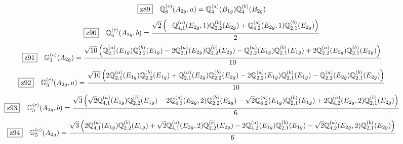 \documentclass[fleqn,10pt,landscape]{jsarticle}
\begin{document}
\begin{dmath*}
\hspace*{3mm}\fbox{z89}\quad \mathbb{Q}_{6}^{(c)}(A_{2g},a)=\mathbb{Q}_{4}^{(a)}(B_{1g}) \mathbb{Q}_{4}^{(b)}(B_{2g})
\end{dmath*}
\begin{dmath*}
\hspace*{3mm}\fbox{z90}\quad \mathbb{Q}_{6}^{(c)}(A_{2g},b)=\frac{\sqrt{2} \left(- \mathbb{Q}_{4,1}^{(a)}(E_{2g},1) \mathbb{Q}_{2,2}^{(b)}(E_{2g}) + \mathbb{Q}_{4,2}^{(a)}(E_{2g},1) \mathbb{Q}_{2,1}^{(b)}(E_{2g})\right)}{2}
\end{dmath*}
\begin{dmath*}
\hspace*{3mm}\fbox{z91}\quad \mathbb{G}_{1}^{(c)}(A_{2g})=\frac{\sqrt{10} \left(\mathbb{Q}_{2,1}^{(a)}(E_{1g}) \mathbb{Q}_{2,2}^{(b)}(E_{1g}) - 2 \mathbb{Q}_{2,1}^{(a)}(E_{2g}) \mathbb{Q}_{2,2}^{(b)}(E_{2g}) - \mathbb{Q}_{2,2}^{(a)}(E_{1g}) \mathbb{Q}_{2,1}^{(b)}(E_{1g}) + 2 \mathbb{Q}_{2,2}^{(a)}(E_{2g}) \mathbb{Q}_{2,1}^{(b)}(E_{2g})\right)}{10}
\end{dmath*}
\begin{dmath*}
\hspace*{3mm}\fbox{z92}\quad \mathbb{G}_{3}^{(c)}(A_{2g},a)=\frac{\sqrt{10} \left(2 \mathbb{Q}_{2,1}^{(a)}(E_{1g}) \mathbb{Q}_{2,2}^{(b)}(E_{1g}) + \mathbb{Q}_{2,1}^{(a)}(E_{2g}) \mathbb{Q}_{2,2}^{(b)}(E_{2g}) - 2 \mathbb{Q}_{2,2}^{(a)}(E_{1g}) \mathbb{Q}_{2,1}^{(b)}(E_{1g}) - \mathbb{Q}_{2,2}^{(a)}(E_{2g}) \mathbb{Q}_{2,1}^{(b)}(E_{2g})\right)}{10}
\end{dmath*}
\begin{dmath*}
\hspace*{3mm}\fbox{z93}\quad \mathbb{G}_{3}^{(c)}(A_{2g},b)=\frac{\sqrt{3} \left(\sqrt{2} \mathbb{Q}_{4,1}^{(a)}(E_{1g}) \mathbb{Q}_{2,2}^{(b)}(E_{1g}) - 2 \mathbb{Q}_{4,1}^{(a)}(E_{2g},2) \mathbb{Q}_{2,2}^{(b)}(E_{2g}) - \sqrt{2} \mathbb{Q}_{4,2}^{(a)}(E_{1g}) \mathbb{Q}_{2,1}^{(b)}(E_{1g}) + 2 \mathbb{Q}_{4,2}^{(a)}(E_{2g},2) \mathbb{Q}_{2,1}^{(b)}(E_{2g})\right)}{6}
\end{dmath*}
\begin{dmath*}
\hspace*{3mm}\fbox{z94}\quad \mathbb{G}_{5}^{(c)}(A_{2g})=\frac{\sqrt{3} \left(2 \mathbb{Q}_{4,1}^{(a)}(E_{1g}) \mathbb{Q}_{2,2}^{(b)}(E_{1g}) + \sqrt{2} \mathbb{Q}_{4,1}^{(a)}(E_{2g},2) \mathbb{Q}_{2,2}^{(b)}(E_{2g}) - 2 \mathbb{Q}_{4,2}^{(a)}(E_{1g}) \mathbb{Q}_{2,1}^{(b)}(E_{1g}) - \sqrt{2} \mathbb{Q}_{4,2}^{(a)}(E_{2g},2) \mathbb{Q}_{2,1}^{(b)}(E_{2g})\right)}{6}
\end{dmath*}
\end{document}
